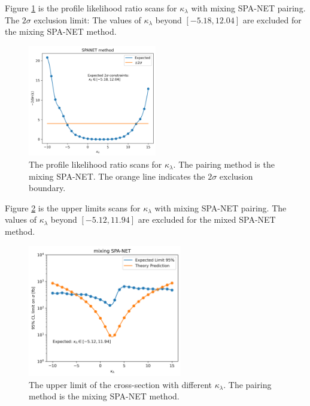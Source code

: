 \documentclass[12pt]{article}
\begin{document}
		Figure \ref{fig:log_likelihood_ratio_kappa_SPANET_mix} is the profile likelihood ratio scans for $\kappa_\lambda$ with mixing SPA-NET pairing. The $2\sigma$ exclusion limit: The values of $\kappa_\lambda$ beyond $\left[ -5.18, 12.04 \right]$ are excluded for the mixing SPA-NET method.
		\begin{figure}[htpb]
			\centering
			\includegraphics[width=0.5\textwidth]{log_likelihood_ratio_kappa_SPANET-mix.png}
			\caption{The profile likelihood ratio scans for $\kappa_\lambda$. The pairing method is the mixing SPA-NET. The orange line indicates the $2\sigma$ exclusion boundary.}
			\label{fig:log_likelihood_ratio_kappa_SPANET_mix}
		\end{figure}

		Figure \ref{fig:CL_limit_kappa_SPANET_mix} is the upper limits scans for $\kappa_\lambda$ with mixing SPA-NET pairing. The values of $\kappa_\lambda$ beyond $\left[ -5.12, 11.94 \right]$ are excluded for the mixed SPA-NET method.
		\begin{figure}[htpb]
			\centering
			\includegraphics[width=0.6\textwidth]{CL_limit_kappa_SPANET-mix.png}
			\caption{The upper limit of the cross-section with different $\kappa_\lambda$. The pairing method is the mixing SPA-NET method.}
			\label{fig:CL_limit_kappa_SPANET_mix}
		\end{figure}
\end{document}
